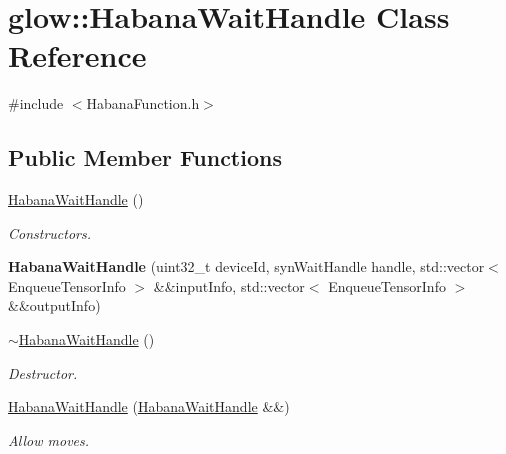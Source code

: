 \hypertarget{classglow_1_1_habana_wait_handle}{}\section{glow\+:\+:Habana\+Wait\+Handle Class Reference}
\label{classglow_1_1_habana_wait_handle}


{\ttfamily \#include $<$Habana\+Function.\+h$>$}

\subsection*{Public Member Functions}
\begin{DoxyCompactItemize}
\item 
\mbox{\label{classglow_1_1_habana_wait_handle_a2eab78071cddfb6fcc45568e17218025}} 
\hyperlink{classglow_1_1_habana_wait_handle_a2eab78071cddfb6fcc45568e17218025}{Habana\+Wait\+Handle} ()
\begin{DoxyCompactList}\small\item\em Constructors. \end{DoxyCompactList}\item 
\mbox{\label{classglow_1_1_habana_wait_handle_aa233682cf15e8569a40b8ca50882fa21}} 
{\bfseries Habana\+Wait\+Handle} (uint32\+\_\+t device\+Id, syn\+Wait\+Handle handle, std\+::vector$<$ Enqueue\+Tensor\+Info $>$ \&\&input\+Info, std\+::vector$<$ Enqueue\+Tensor\+Info $>$ \&\&output\+Info)
\item 
\mbox{\label{classglow_1_1_habana_wait_handle_a00c27cc1cb084a65da5ad5aaeedc857e}} 
\hyperlink{classglow_1_1_habana_wait_handle_a00c27cc1cb084a65da5ad5aaeedc857e}{$\sim$\+Habana\+Wait\+Handle} ()
\begin{DoxyCompactList}\small\item\em Destructor. \end{DoxyCompactList}\item 
\mbox{\label{classglow_1_1_habana_wait_handle_ad793416bd47a5fcc6f1fa477b60ca43a}} 
\hyperlink{classglow_1_1_habana_wait_handle_ad793416bd47a5fcc6f1fa477b60ca43a}{Habana\+Wait\+Handle} (\hyperlink{classglow_1_1_habana_wait_handle}{Habana\+Wait\+Handle} \&\&)
\begin{DoxyCompactList}\small\item\em Allow moves. \end{DoxyCompactList}\item 

\end{DoxyCompactItemize}
